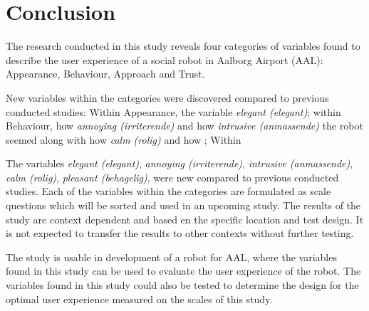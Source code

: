\section{Conclusion}
\label{Conclusion}


The research conducted in this study reveals four categories of variables found to describe the user experience of a social robot in Aalborg Airport (AAL): Appearance, Behaviour, Approach and Trust.


New variables within the categories were discovered compared to previous conducted studies: Within Appearance, the variable \textit{elegant (elegant)}; within Behaviour, how \textit{annoying (irriterende)} and how \textit{intrusive (anmassende)} the robot seemed along with how \textit{calm (rolig)} and how ; Within 


The variables \textit{elegant (elegant)}, \textit{annoying (irriterende)}, \textit{intrusive (anmassende)}, \textit{calm (rolig)}, \textit{ pleasant (behagelig)},  were new compared to previous conducted studies. Each of the variables within the categories are formulated as scale questions which will be sorted and used in an upcoming study. The results of the study are context dependent and based en the specific location and test design. It is not expected to transfer the results to other contexts without further testing. 

The study is usable in development of a robot for AAL, where the variables found in this study can be used to evaluate the user experience of the robot. The variables found in this study could also be tested to determine the design for the optimal user experience measured on the scales of this study. 


